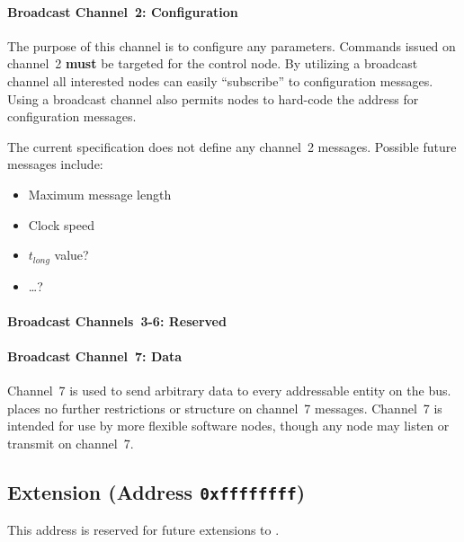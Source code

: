 \paragraph{Broadcast Channel~2: \bus Configuration}
\label{sec:channel-2}

The purpose of this channel is to configure any \bus parameters. Commands
issued on channel~2 {\bf must} be targeted for the control node. By utilizing
a broadcast channel all interested nodes can easily ``subscribe'' to
configuration messages. Using a broadcast channel also permits nodes to
hard-code the address for configuration messages.

The current \bus specification does not define any channel~2 messages.
Possible future messages include:
\begin{itemize}
  \item Maximum message length
  \item Clock speed
  \item $t_{long}$ value?
  \item \ldots?
\end{itemize}

\paragraph{Broadcast Channels~3-6: Reserved}
\label{sec:channel-3-6}

\paragraph{Broadcast Channel~7: Data}
\label{sec:channel-7}
Channel~7 is used to send arbitrary data to every addressable entity on the
bus. \bus places no further restrictions or structure on channel~7 messages.
Channel~7 is intended for use by more flexible software nodes, though any node
may listen or transmit on channel~7.

\subsection{Extension (Address \texttt{0xffffffff})}
This address is reserved for future extensions to \bus.

